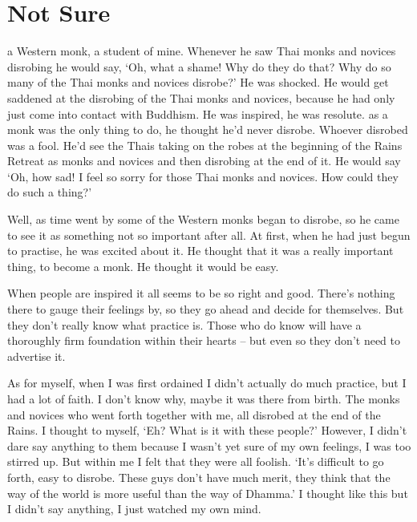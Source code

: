 

\chapter{Not Sure}

 a Western monk, a student of mine. Whenever he saw Thai monks and novices disrobing he would say, `Oh, what a shame! Why do they do that? Why do so many of the Thai monks and novices disrobe?' He was shocked. He would get saddened at the disrobing of the Thai monks and novices, because he had only just come into contact with Buddhism. He was inspired, he was resolute.  as a monk was the only thing to do, he thought he'd never disrobe. Whoever disrobed was a fool. He'd see the Thais taking on the robes at the beginning of the Rains Retreat as monks and novices and then disrobing at the end of it. He would say `Oh, how sad! I feel so sorry for those Thai monks and novices. How could they do such a thing?' 

Well, as time went by some of the Western monks began to disrobe, so he came to see it as something not so important after all. At first, when he had just begun to practise, he was excited about it. He thought that it was a really important thing, to become a monk. He thought it would be easy. 

When people are inspired it all seems to be so right and good. There's nothing there to gauge their feelings by, so they go ahead and decide for themselves. But they don't really know what practice is. Those who do know will have a thoroughly firm foundation within their hearts -- but even so they don't need to advertise it. 

As for myself, when I was first ordained I didn't actually do much practice, but I had a lot of faith. I don't know why, maybe it was there from birth. The monks and novices who went forth together with me, all disrobed at the end of the Rains. I thought to myself, `Eh? What is it with these people?' However, I didn't dare say anything to them because I wasn't yet sure of my own feelings, I was too stirred up. But within me I felt that they were all foolish. `It's difficult to go forth, easy to disrobe. These guys don't have much merit, they think that the way of the world is more useful than the way of Dhamma.' I thought like this but I didn't say anything, I just watched my own mind. 

